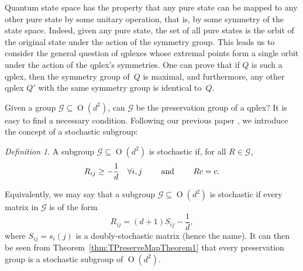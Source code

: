 \documentclass[aps,pra,superscriptaddress,10pt,tightenlines,twocolumn,nofootinbib]{revtex4}
\theoremstyle{remark}
\newtheorem{definition}{Definition}
\newcommand{\be}{\begin{equation}}
\newcommand{\ee}{\end{equation}}
\newcommand{\qp}{Q}
\newcommand{\gp}{\mathcal{G}}
\DeclareMathOperator{\Ot}{O}
\begin{document}
Quantum state space has the property that any pure state can be mapped
to any other pure state by some unitary operation, that is, by some
symmetry of the state space.  Indeed, given any pure state, the set of
all pure states is the orbit of the original state under the action of
the symmetry group.  This leads us to consider the general question of
qplexes whose extremal points form a single orbit under the action of
the qplex's symmetries.  One can prove that if $\qp$ is such a qplex,
then the symmetry group of~$\qp$ is maximal, and furthermore, any other
qplex $\qp'$ with the same symmetry group is identical to~$\qp$.



Given a group $\gp \subseteq \Ot(d^2)$, can $\gp$ be the preservation group
of a qplex? It is easy to find a necessary condition.  Following our
previous paper \cite{GroupAlg}, we introduce the concept of a
stochastic subgroup:
\begin{definition}
A subgroup $\gp\subseteq \Ot(d^2)$ is stochastic if, for all $R\in \gp$,
\be
R_{ij} \ge -\frac{1}{d} \quad \forall i,j
\quad\quad \hbox{ and }  \quad\quad
R c = c.
\ee
\end{definition}
Equivalently, we may say that a subgroup $\gp\subseteq \Ot(d^2)$ is stochastic if every matrix in $\gp$ is of the form
\be
R_{ij} = (d+1) S_{ij} - \frac{1}{d},
\ee
where $S_{ij} = s_i(j)$ is a doubly-stochastic matrix (hence the name).
It can  then be seen from Theorem~\ref{thm:TPreserveMapTheorem1} that every preservation group is a stochastic subgroup of $\Ot(d^2)$.
\end{document}
